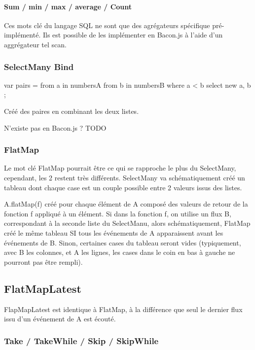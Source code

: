       \paragraph{Sum / min / max / average / Count}
        Ces mots clé du langage SQL ne sont que des agrégateurs spécifique pré-implémenté.
        Ils est possible de les implémenter en Bacon.js à l'aide d'un aggrégateur tel scan.


    \subsubsection{SelectMany Bind}
      var pairs = 
        from a in numbersA 
        from b in numbersB 
        where a < b 
        select new { a, b };

        Créé des paires en combinant les deux listes.

        N'existe pas en Bacon.js ? TODO

    \subsubsection{FlatMap}

      Le mot clé FlatMap pourrait être ce qui se rapproche le plus du SelectMany, cependant, les 2 restent très différents.
      SelectMany va schématiquement créé un tableau dont chaque case est un couple possible entre 2 valeurs issus des listes.

      A.flatMap(f) créé pour chaque élément de A composé des valeurs de retour de la fonction f appliqué à un élément.
      Si dans la fonction f, on utilise un flux B, correspondant à la seconde liste du SelectManu, alors schématiquement, FlatMap créé le même tableau SI tous les événements de A apparaissent avant les événements de B.
      Sinon, certaines cases du tableau seront vides (typiquement, avec B les colonnes, et A les lignes, les cases dans le coin en bas à gauche ne pourront pas être rempli).

    \subsection{FlatMapLatest}

      FlapMapLatest est identique à FlatMap, à la différence que seul le dernier flux issu d'un événement de A est écouté.

    \subsubsection{Take / TakeWhile / Skip / SkipWhile}

